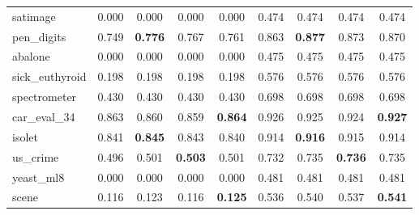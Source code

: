 \begin{figure}[ht]
\begin{tabular}{p{22mm}|*4{p{14mm}}|*4{p{14mm}}}
        satimage&\multicolumn{1}{c}{0.000}&\multicolumn{1}{c}{0.000}&\multicolumn{1}{c}{0.000}&\multicolumn{1}{c|}{0.000}&\multicolumn{1}{c}{0.474}&\multicolumn{1}{c}{0.474}&\multicolumn{1}{c}{0.474}&\multicolumn{1}{c}{0.474}\\
        pen\_digits&\multicolumn{1}{c}{0.749}&\multicolumn{1}{c}{\textbf{0.776}}&\multicolumn{1}{c}{0.767}&\multicolumn{1}{c|}{0.761}&\multicolumn{1}{c}{0.863}&\multicolumn{1}{c}{\textbf{0.877}}&\multicolumn{1}{c}{0.873}&\multicolumn{1}{c}{0.870}\\
        abalone&\multicolumn{1}{c}{0.000}&\multicolumn{1}{c}{0.000}&\multicolumn{1}{c}{0.000}&\multicolumn{1}{c|}{0.000}&\multicolumn{1}{c}{0.475}&\multicolumn{1}{c}{0.475}&\multicolumn{1}{c}{0.475}&\multicolumn{1}{c}{0.475}\\
        sick\_euthyroid&\multicolumn{1}{c}{0.198}&\multicolumn{1}{c}{0.198}&\multicolumn{1}{c}{0.198}&\multicolumn{1}{c|}{0.198}&\multicolumn{1}{c}{0.576}&\multicolumn{1}{c}{0.576}&\multicolumn{1}{c}{0.576}&\multicolumn{1}{c}{0.576}\\
        spectrometer&\multicolumn{1}{c}{0.430}&\multicolumn{1}{c}{0.430}&\multicolumn{1}{c}{0.430}&\multicolumn{1}{c|}{0.430}&\multicolumn{1}{c}{0.698}&\multicolumn{1}{c}{0.698}&\multicolumn{1}{c}{0.698}&\multicolumn{1}{c}{0.698}\\
        car\_eval\_34&\multicolumn{1}{c}{0.863}&\multicolumn{1}{c}{0.860}&\multicolumn{1}{c}{0.859}&\multicolumn{1}{c|}{\textbf{0.864}}&\multicolumn{1}{c}{0.926}&\multicolumn{1}{c}{0.925}&\multicolumn{1}{c}{0.924}&\multicolumn{1}{c}{\textbf{0.927}}\\
        isolet&\multicolumn{1}{c}{0.841}&\multicolumn{1}{c}{\textbf{0.845}}&\multicolumn{1}{c}{0.843}&\multicolumn{1}{c|}{0.840}&\multicolumn{1}{c}{0.914}&\multicolumn{1}{c}{\textbf{0.916}}&\multicolumn{1}{c}{0.915}&\multicolumn{1}{c}{0.914}\\
        us\_crime&\multicolumn{1}{c}{0.496}&\multicolumn{1}{c}{0.501}&\multicolumn{1}{c}{\textbf{0.503}}&\multicolumn{1}{c|}{0.501}&\multicolumn{1}{c}{0.732}&\multicolumn{1}{c}{0.735}&\multicolumn{1}{c}{\textbf{0.736}}&\multicolumn{1}{c}{0.735}\\
        yeast\_ml8&\multicolumn{1}{c}{0.000}&\multicolumn{1}{c}{0.000}&\multicolumn{1}{c}{0.000}&\multicolumn{1}{c|}{0.000}&\multicolumn{1}{c}{0.481}&\multicolumn{1}{c}{0.481}&\multicolumn{1}{c}{0.481}&\multicolumn{1}{c}{0.481}\\
        scene&\multicolumn{1}{c}{0.116}&\multicolumn{1}{c}{0.123}&\multicolumn{1}{c}{0.116}&\multicolumn{1}{c|}{\textbf{0.125}}&\multicolumn{1}{c}{0.536}&\multicolumn{1}{c}{0.540}&\multicolumn{1}{c}{0.537}&\multicolumn{1}{c}{\textbf{0.541}}\\

\end{tabular}
\end{figure}
